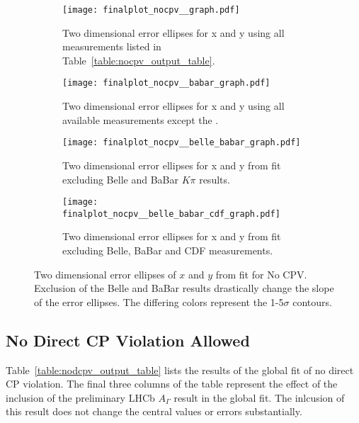 \begin{figure}[htb]
  \begin{center}
    \begin{subfigure}[b]{0.4\textwidth}
      \centering
      \texttt{[image: finalplot\_nocpv\_\_graph.pdf]}
      \caption{Two dimensional error ellipses for x and y using all measurements listed in Table~\ref{table:nocpv_output_table}.}
      \label{fig:xy_no_cpv_}
    \end{subfigure}%
    \begin{subfigure}[b]{0.4\textwidth}
      \centering
      \texttt{[image: finalplot\_nocpv\_\_babar\_graph.pdf]}
      \caption{Two dimensional error ellipses for x and y using all available measurements except the .}
      \label{fig:xy_no_cpv_}
    \end{subfigure}%
    
    \begin{subfigure}[b]{0.4\textwidth}
      \centering
      \texttt{[image: finalplot\_nocpv\_\_belle\_babar\_graph.pdf]}
      \caption{Two dimensional error ellipses for x and y from fit excluding Belle and BaBar $K\pi$ results.}
      \label{fig:xy_no_cpv_nobelle_babar}
    \end{subfigure}%
    \hspace{2mm}
    \begin{subfigure}[b]{0.4\textwidth}
      \centering
      \texttt{[image: finalplot\_nocpv\_\_belle\_babar\_cdf\_graph.pdf]}
      \caption{Two dimensional error ellipses for x and y from fit excluding Belle, BaBar and CDF measurements.}
      \label{fig:xy_no_cpv_nocdf}
    \end{subfigure}%
  \end{center}
  \caption{Two dimensional error ellipses of $x$ and $y$ from fit for No CPV. Exclusion of the Belle and BaBar results drastically change the slope of the error ellipses. The differing colors represent the 1-5$\sigma$ contours.}
  \label{fig:xy_nocpv_variations}
\end{figure}
\subsection{No Direct CP Violation Allowed}
Table~\ref{table:nodcpv_output_table} lists the results of the global fit of no direct
CP violation. The final three columns of the table represent the effect of the 
inclusion of the preliminary LHCb $A_\Gamma$ result in the global fit.
The inlcusion of this result does not change the central values or errors substantially.

